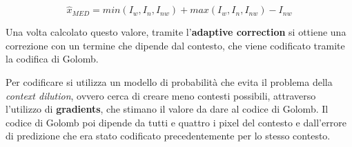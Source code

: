 \[\hat{x}_{MED} = min(I_w, I_n, I_{nw}) + max(I_w, I_n, I_{nw}) - I_{nw}\]

Una volta calcolato questo valore, tramite l'\textbf{adaptive correction} si ottiene una correzione con un termine che dipende dal contesto, che viene codificato tramite la codifica di Golomb. 

Per codificare si utilizza un modello di probabilità che evita il problema della \textit{context dilution}, ovvero cerca di creare meno contesti possibili, attraverso l'utilizzo di \textbf{gradients}, che stimano il valore da dare al codice di Golomb. Il codice di Golomb poi dipende da tutti e quattro i pixel del contesto e dall'errore di predizione che era stato codificato precedentemente per lo stesso contesto.


\let\cleardoublepage\clearpage